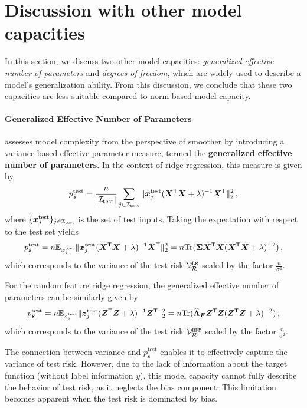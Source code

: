 \section{Discussion with other model capacities}
\label{sec:discussion}

In this section, we discuss two other model capacities: {\em generalized effective number of parameters} and {\em degrees of freedom}, which are widely used to describe a model's generalization ability. From this discussion, we conclude that these two capacities are less suitable compared to norm-based model capacity.

\paragraph{Generalized Effective Number of Parameters} \citet{curth2024u} assesses model complexity from the perspective of smoother by introducing a variance-based effective-parameter measure, termed the {\bf generalized effective number of parameters}. In the context of ridge regression, this measure is given by
\[
\begin{aligned}
    p_{\hat{\bm{s}}}^{\text{test}} = \frac{n}{|\mathcal{I}_{\text{test}}|}\sum_{j \in \mathcal{I}_{\text{test}}} \|{\boldsymbol x}_{j}^{\text{test}}({\boldsymbol X}^{\mathsf T} {\boldsymbol X} + \lambda)^{-1}{\boldsymbol X}^{\mathsf T}\|_2^2\,,
\end{aligned}
\]
where $\{{\boldsymbol x}_{j}^{\text{test}}\}_{j\in\mathcal{I}_{\text{test}}}$ is the set of test inputs. Taking the expectation with respect to the test set yields
\[
    p_{\hat{\bm{s}}}^{\text{test}} = n \mathbb{E}_{{\boldsymbol x}_{j}^{\text{test}}} \|{\boldsymbol x}_{j}^{\text{test}}({\boldsymbol X}^{\mathsf T} {\boldsymbol X} + \lambda)^{-1}{\boldsymbol X}^{\mathsf T}\|_2^2 = n{\rm Tr}({\boldsymbol \Sigma}{\boldsymbol X}^{\mathsf T}{\boldsymbol X}({\boldsymbol X}^{\mathsf T}{\boldsymbol X} + \lambda)^{-2})\,,
\]
which corresponds to the variance of the test risk $\mathcal{V}^{\tt LS}_\mathcal{R}$ scaled by the factor $\frac{n}{\sigma^2}$. 

For the random feature ridge regression, the generalized effective number of parameters can be similarly given by
\[
    p_{\hat{\bm{s}}}^{\text{test}} = n \mathbb{E}_{{\boldsymbol z}_{j}^{\text{test}}} \|{\boldsymbol z}_{j}^{\text{test}}({\boldsymbol Z}^{\mathsf T} {\boldsymbol Z} + \lambda)^{-1}{\boldsymbol Z}^{\mathsf T}\|_2^2 = n{\rm Tr}(\widehat{{\boldsymbol \Lambda}}_{\boldsymbol F}{\boldsymbol Z}^{\mathsf T}{\boldsymbol Z}({\boldsymbol Z}^{\mathsf T}{\boldsymbol Z} + \lambda)^{-2})\,,
\]
which corresponds to the variance of the test risk $\mathcal{V}^{\tt RFM}_\mathcal{R}$ scaled by the factor $\frac{n}{\sigma^2}$.

The connection between variance and \( p_{\hat{\bm{s}}}^{\text{test}} \) enables it to effectively capture the variance of test risk. However, due to the lack of information about the target function (without label information $y$), this model capacity cannot fully describe the behavior of test risk, as it neglects the bias component. This limitation becomes apparent when the test risk is dominated by bias.


